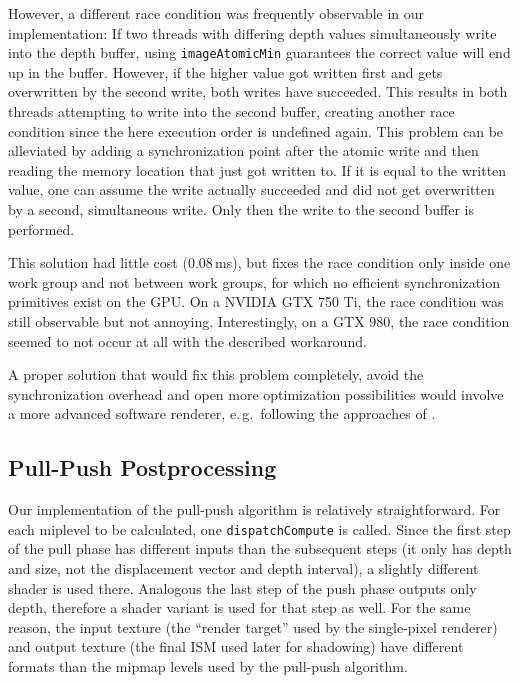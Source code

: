 However, a different race condition was frequently observable in our implementation:
If two threads with differing depth values simultaneously write into the depth buffer, using \texttt{imageAtomicMin} guarantees the correct value will end up in the buffer. However, if the higher value got written first and gets overwritten by the second write, both writes have succeeded. This results in both threads attempting to write into the second buffer, creating another race condition since the here execution order is undefined again. This problem can be alleviated by adding a synchronization point after the atomic write and then reading the memory location that just got written to. If it is equal to the written value, one can assume the write actually succeeded and did not get overwritten by a second, simultaneous write. Only then the write to the second buffer is performed.

This solution had little cost (0.08\,ms), but fixes the race condition only inside one work group and not between work groups, for which no efficient synchronization primitives exist on the GPU. On a NVIDIA GTX 750 Ti, the race condition was still observable but not annoying. Interestingly, on a GTX 980, the race condition seemed to not occur at all with the described workaround.

A proper solution that would fix this problem completely, avoid the synchronization overhead and open more optimization possibilities would involve a more advanced software renderer, e.\,g.\ following the approaches of \citet{Laine:2011:SoftwareRasterization}.


\subsection{Pull-Push Postprocessing}
\label{sec:impl:pullPushPostprocessing}

Our implementation of the pull-push algorithm is relatively straightforward. For each miplevel to be calculated, one \texttt{dispatchCompute} is called. Since the first step of the pull phase has different inputs than the subsequent steps (it only has depth and size, not the displacement vector and depth interval), a slightly different shader is used there. Analogous the last step of the push phase outputs only depth, therefore a shader variant is used for that step as well. For the same reason, the input texture (the ``render target'' used by the single-pixel renderer) and output texture (the final ISM used later for shadowing) have different formats than the mipmap levels used by the pull-push algorithm.



